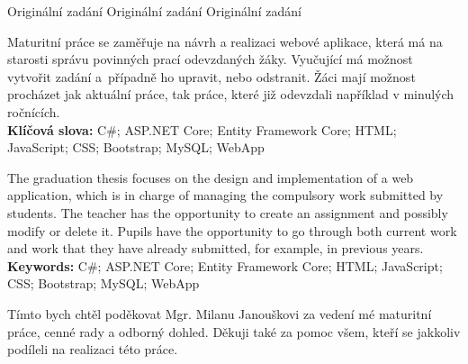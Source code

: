 \documentclass[a4paper, 12pt]{report}
\begin{document}
	\titulniStrana

	\newpage\thispagestyle{empty}
	Originální zadání
	\newpage
	\newpage\null\thispagestyle{empty}
	Originální zadání
	\newpage
	\newpage\null\thispagestyle{empty}
	Originální zadání
	\newpage

	\anotace Maturitní práce se zaměřuje na návrh a realizaci webové aplikace, která má na starosti správu povinných prací odevzdaných žáky. Vyučující má možnost vytvořit zadání a~případně ho upravit, nebo odstranit. Žáci mají možnost procházet jak aktuální práce, tak práce, které již odevzdali například v minulých ročnících. \\
	\textbf{Klíčová slova: } C\#; ASP.NET Core; Entity Framework Core; HTML; JavaScript; CSS; Bootstrap; MySQL; WebApp

	\annotation The graduation thesis focuses on the design and implementation of a web application, which is in charge of managing the compulsory work submitted by students. The teacher has the opportunity to create an assignment and possibly modify or delete it. Pupils have the opportunity to go through both current work and work that they have already submitted, for example, in previous years.\\
	\textbf{Keywords: } C\#; ASP.NET Core; Entity Framework Core; HTML; JavaScript; CSS; Bootstrap; MySQL; WebApp


	\podekovani Tímto bych chtěl poděkovat Mgr. Milanu Janouškovi za vedení mé maturitní práce, cenné rady a odborný dohled. Děkuji také za pomoc všem, kteří se jakkoliv podíleli na realizaci této práce.
	
	\obsah
\end{document}
